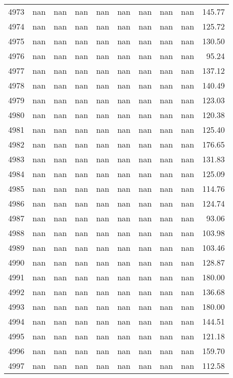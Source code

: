 \begin{tabular}{lrrrrrrrrr}
4973 & nan & nan & nan & nan & nan & nan & nan & nan & 145.77 \\
4974 & nan & nan & nan & nan & nan & nan & nan & nan & 125.72 \\
4975 & nan & nan & nan & nan & nan & nan & nan & nan & 130.50 \\
4976 & nan & nan & nan & nan & nan & nan & nan & nan & 95.24 \\
4977 & nan & nan & nan & nan & nan & nan & nan & nan & 137.12 \\
4978 & nan & nan & nan & nan & nan & nan & nan & nan & 140.49 \\
4979 & nan & nan & nan & nan & nan & nan & nan & nan & 123.03 \\
4980 & nan & nan & nan & nan & nan & nan & nan & nan & 120.38 \\
4981 & nan & nan & nan & nan & nan & nan & nan & nan & 125.40 \\
4982 & nan & nan & nan & nan & nan & nan & nan & nan & 176.65 \\
4983 & nan & nan & nan & nan & nan & nan & nan & nan & 131.83 \\
4984 & nan & nan & nan & nan & nan & nan & nan & nan & 125.09 \\
4985 & nan & nan & nan & nan & nan & nan & nan & nan & 114.76 \\
4986 & nan & nan & nan & nan & nan & nan & nan & nan & 124.74 \\
4987 & nan & nan & nan & nan & nan & nan & nan & nan & 93.06 \\
4988 & nan & nan & nan & nan & nan & nan & nan & nan & 103.98 \\
4989 & nan & nan & nan & nan & nan & nan & nan & nan & 103.46 \\
4990 & nan & nan & nan & nan & nan & nan & nan & nan & 128.87 \\
4991 & nan & nan & nan & nan & nan & nan & nan & nan & 180.00 \\
4992 & nan & nan & nan & nan & nan & nan & nan & nan & 136.68 \\
4993 & nan & nan & nan & nan & nan & nan & nan & nan & 180.00 \\
4994 & nan & nan & nan & nan & nan & nan & nan & nan & 144.51 \\
4995 & nan & nan & nan & nan & nan & nan & nan & nan & 121.18 \\
4996 & nan & nan & nan & nan & nan & nan & nan & nan & 159.70 \\
4997 & nan & nan & nan & nan & nan & nan & nan & nan & 112.58 \\

\end{tabular}
